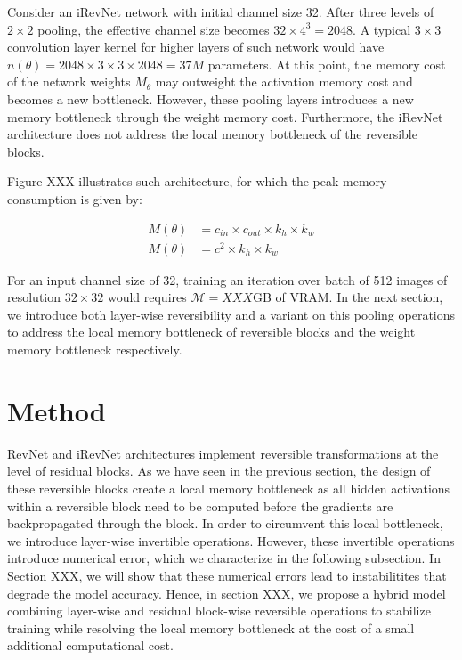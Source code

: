 \documentclass[twocolumn]{bmcart}
\begin{document}
Consider an iRevNet network with initial channel size 32.
After three levels of $2 \times 2$ pooling, the effective channel size becomes $32 \times 4^3=2048$. A typical $3 \times 3$ convolution layer kernel for higher layers of such network would have $n(\theta)=2048 \times 3 \times 3 \times 2048=37M$ parameters.
At this point, the memory cost of the network weights $M_{\theta}$ may outweight the activation memory cost and becomes a new bottleneck.
However, these pooling layers introduces a new memory bottleneck through the weight memory cost.
Furthermore, the iRevNet architecture does not address the local memory bottleneck of the reversible blocks.

Figure XXX illustrates such architecture, for which the peak memory consumption is given by:

\begin{subequations}
\begin{align}
M(\theta) &= c_{in} \times c_{out} \times k_h \times k_w \\
M(\theta) &= c^2 \times k_h \times k_w
\end{align}
\end{subequations}

For an input channel size of 32,  training an iteration over batch of 512 images of resolution $32 \times 32$ would requires $\mathcal{M}=XXX$GB of VRAM. 
In the next section, we introduce both layer-wise reversibility and a variant on this pooling operations to address the local memory bottleneck of reversible blocks and the weight memory bottleneck respectively.

\section{Method}

RevNet and iRevNet architectures implement reversible transformations at the level of residual blocks. 
As we have seen in the previous section, the design of these reversible blocks create a local memory bottleneck as all hidden activations within a reversible block need to be computed before the gradients are backpropagated through the block. 
In order to circumvent this local bottleneck, we introduce layer-wise invertible operations. 
However, these invertible operations introduce numerical error, which we characterize in the following subsection. 
In Section XXX, we will show that these numerical errors lead to instabilitites that degrade the model accuracy. 
Hence, in section XXX, we propose a hybrid model combining layer-wise and residual block-wise reversible operations to stabilize training while resolving the local memory bottleneck at the cost of a small additional computational cost.
\end{document}
